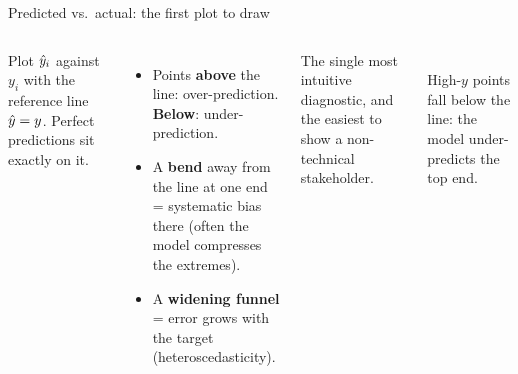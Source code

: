 \documentclass[aspectratio=169]{beamer}
\begin{document}
\begin{frame}{Predicted vs.\ actual: the first plot to draw}
  \begin{columns}[T]
    Plot $\hat{y}_i$ against $y_i$ with the reference line $\hat{y} = y$. Perfect predictions sit exactly on it.
    \vfill
    \begin{itemize}\small
      \item Points \textbf{above} the line: over-prediction. \textbf{Below}: under-prediction.
      \item A \textbf{bend} away from the line at one end = systematic bias there (often the model compresses the extremes).
      \item A \textbf{widening funnel} = error grows with the target (heteroscedasticity).
    \end{itemize}
    \vfill
    \footnotesize The single most intuitive diagnostic, and the easiest to show a non-technical stakeholder.
    \begin{center}
      \\[2pt]
      \scriptsize High-$y$ points fall below the line: the model under-predicts the top end.
    \end{center}
  \end{columns}
\end{frame}
\end{document}
